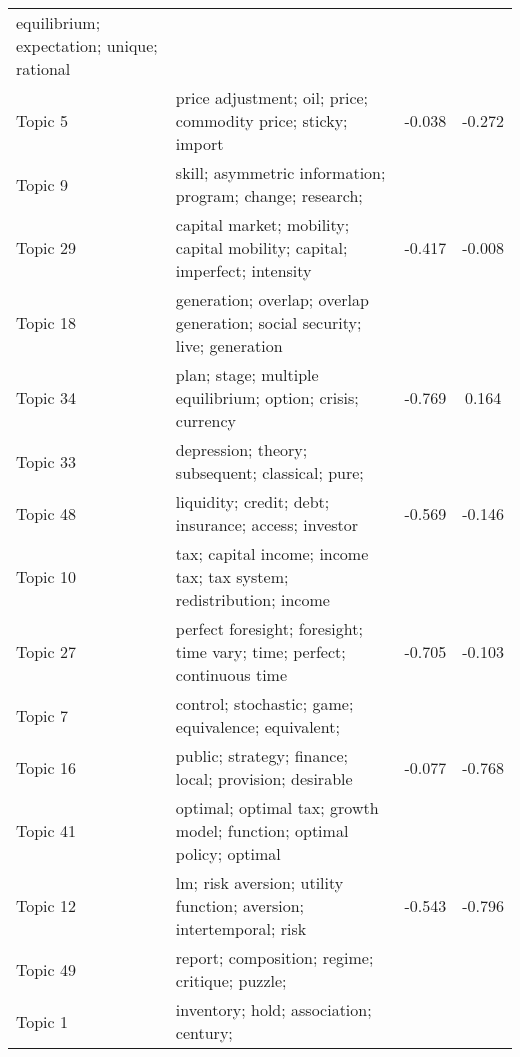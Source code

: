 \documentclass[
  12pt,
  onecolumn]{article}
\begin{document}
\begin{longtable}[t]{l>{\raggedright\arraybackslash}m{30em}cc}
equilibrium;
expectation;
unique;
rational
\cellcolor{gray!6}{expectation} & \cellcolor{gray!6}{0.042} & \cellcolor{gray!6}{-0.339}\\
Topic 5 & price
adjustment;
oil;
price;
commodity
price;
sticky;
import & -0.038 & -0.272\\
Topic 9 & skill;
asymmetric
information;
program;
change;
research;
\cellcolor{gray!6}{complementarity} & \cellcolor{gray!6}{-0.012} & \cellcolor{gray!6}{-0.321}\\
Topic 29 & capital
market;
mobility;
capital
mobility;
capital;
imperfect;
intensity & -0.417 & -0.008\\
Topic 18 & generation;
overlap;
overlap
generation;
social
security;
live;
generation
\cellcolor{gray!6}{model} & \cellcolor{gray!6}{-0.294} & \cellcolor{gray!6}{-0.308}\\
\addlinespace
Topic 34 & plan;
stage;
multiple
equilibrium;
option;
crisis;
currency & -0.769 & 0.164\\
Topic 33 & depression;
theory;
subsequent;
classical;
pure;
\cellcolor{gray!6}{principle} & \cellcolor{gray!6}{0.024} & \cellcolor{gray!6}{-0.688}\\
Topic 48 & liquidity;
credit;
debt;
insurance;
access;
investor & -0.569 & -0.146\\
Topic 10 & tax;
capital
income;
income
tax;
tax
system;
redistribution;
income
\cellcolor{gray!6}{taxation} & \cellcolor{gray!6}{-0.153} & \cellcolor{gray!6}{-0.646}\\
Topic 27 & perfect
foresight;
foresight;
time
vary;
time;
perfect;
continuous
time & -0.705 & -0.103\\
\addlinespace
Topic 7 & control;
stochastic;
game;
equivalence;
equivalent;
\cellcolor{gray!6}{solution} & \cellcolor{gray!6}{-0.203} & \cellcolor{gray!6}{-0.609}\\
Topic 16 & public;
strategy;
finance;
local;
provision;
desirable & -0.077 & -0.768\\
Topic 41 & optimal;
optimal
tax;
growth
model;
function;
optimal
policy;
optimal
\cellcolor{gray!6}{taxation} & \cellcolor{gray!6}{0.042} & \cellcolor{gray!6}{-1.067}\\
Topic 12 & lm;
risk
aversion;
utility
function;
aversion;
intertemporal;
risk & -0.543 & -0.796\\
Topic 49 & report;
composition;
regime;
critique;
puzzle;
\cellcolor{gray!6}{profit} & \cellcolor{gray!6}{-0.294} & \cellcolor{gray!6}{-1.132}\\
\addlinespace
Topic 1 & inventory;
hold;
association;
century;

\end{longtable}
\end{document}
